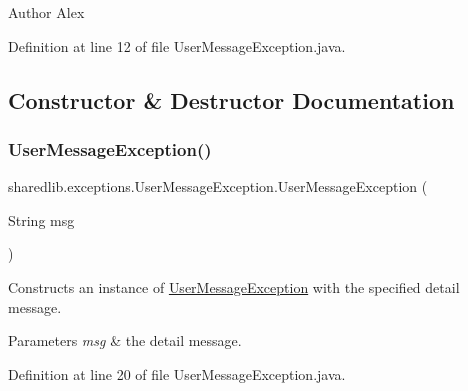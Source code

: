 \begin{DoxyAuthor}{Author}
Alex 
\end{DoxyAuthor}


Definition at line 12 of file User\+Message\+Exception.\+java.



\subsection{Constructor \& Destructor Documentation}
\hypertarget{classsharedlib_1_1exceptions_1_1_user_message_exception_a0f783721b5137a3a012b185c2fa96f44}{}\label{classsharedlib_1_1exceptions_1_1_user_message_exception_a0f783721b5137a3a012b185c2fa96f44} 
\subsubsection{\texorpdfstring{User\+Message\+Exception()}{UserMessageException()}\hspace{0.1cm}{\footnotesize\ttfamily [1/2]}}
{\footnotesize\ttfamily sharedlib.\+exceptions.\+User\+Message\+Exception.\+User\+Message\+Exception (\begin{DoxyParamCaption}\item[{String}]{msg }\end{DoxyParamCaption})}

Constructs an instance of {\ttfamily \hyperlink{classsharedlib_1_1exceptions_1_1_user_message_exception}{User\+Message\+Exception}} with the specified detail message.


\begin{DoxyParams}{Parameters}
{\em msg} & the detail message. \\
\hline
\end{DoxyParams}


Definition at line 20 of file User\+Message\+Exception.\+java.

\hypertarget{classsharedlib_1_1exceptions_1_1_user_message_exception_a7d3408c95f16dcd17d9048f3be5511d0}{}\label{classsharedlib_1_1exceptions_1_1_user_message_exception_a7d3408c95f16dcd17d9048f3be5511d0} 
